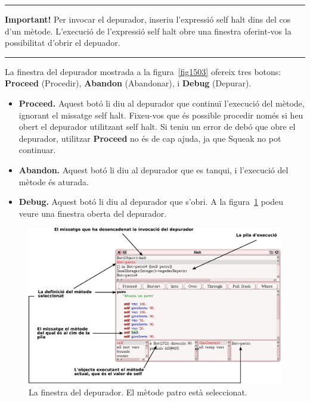 \noindent
\rule{\textwidth}{2pt}
\noindent
\textbf{Important!} Per invocar el depurador, inseriu l'expressió \textsf{self halt} dins del cos d'un mètode. L'execució de l'expressió \textsf{self halt} obre una finestra oferint-vos la possibilitat d'obrir el depuador.\\
\noindent
\rule{\textwidth}{2pt}
\vspace*{1mm}

La finestra del depurador mostrada a la figura~\ref{fig1503} ofereix tres botons: \textbf{Proceed} (Procedir), \textbf{Abandon} (Abandonar), i \textbf{Debug} (Depurar). 
 
\begin{itemize}
\item[] \textbf{Proceed.} Aquest botó li diu al depurador que continuï l'execució del mètode, ignorant el missatge \textsf{self halt}. Fixeu-vos que és possible procedir només si heu obert el depurador utilitzant \textsf{self halt}. Si teniu un error de debó que obre el depurador, utilitzar \textbf{Proceed} no és de cap ajuda, ja que Squeak no pot continuar.
\item[] \textbf{Abandon.} Aquest botó li diu al depurador que es tanqui, i l'execució del mètode és aturada.
\item[] \textbf{Debug.} Aquest botó li diu al depurador que s'obri. A la figura~\ref{fig1504} podeu veure una finestra oberta del depurador.
\end{itemize}

\begin{figure}[h]
\begin{center}
\includegraphics[scale=0.525]{Imatges/figura15-4.pdf}
\end{center}
\caption{La finestra del depurador. El mètode \textsf{\upshape patro} està seleccionat.}
\label{fig1504}
\end{figure}


